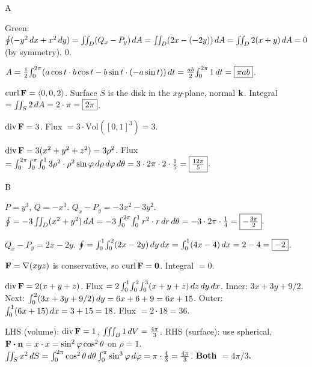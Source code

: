 \documentclass[11pt]{article}
\begin{document}
\begin{answers}{A}
\item Green: $\oint (-y^2 \,dx + x^2 \,dy) = \iint_D (Q_x - P_y) \,dA = \iint_D (2x - (-2y)) \,dA = \iint_D 2(x+y) \,dA = 0$ (by symmetry). $\boxed{0}$.
\item $A = \tfrac{1}{2}\!\int_0^{2\pi}(a\cos t \cdot b\cos t - b\sin t \cdot (-a\sin t)) \,dt = \tfrac{ab}{2}\!\int_0^{2\pi} 1 \,dt = \boxed{\pi a b}$.
\item $\operatorname{curl} \mathbf{F} = \langle 0, 0, 2\rangle$. Surface $S$ is the disk in the $xy$-plane, normal $\mathbf{k}$. Integral $= \iint_S 2 \,dA = 2 \cdot \pi = \boxed{2\pi}$.
\item $\operatorname{div} \mathbf{F} = 3$. Flux $= 3 \cdot \text{Vol}([0,1]^3) = \boxed{3}$.
\item $\operatorname{div} \mathbf{F} = 3(x^2 + y^2 + z^2) = 3\rho^2$. Flux $= \int_0^{2\pi}\!\int_0^\pi\!\int_0^1 3\rho^2 \cdot \rho^2 \sin\varphi \,d\rho \,d\varphi \,d\theta = 3 \cdot 2\pi \cdot 2 \cdot \tfrac{1}{5} = \boxed{\tfrac{12\pi}{5}}$.
\end{answers}

\begin{answers}{B}
\item $P = y^3$, $Q = -x^3$. $Q_x - P_y = -3x^2 - 3y^2$. $\oint = -3\iint_D (x^2 + y^2) \,dA = -3 \int_0^{2\pi}\!\int_0^1 r^2 \cdot r \,dr \,d\theta = -3 \cdot 2\pi \cdot \tfrac{1}{4} = \boxed{-\tfrac{3\pi}{2}}$.
\item $Q_x - P_y = 2x - 2y$. $\oint = \int_0^1\!\int_0^2 (2x - 2y) \,dy \,dx = \int_0^1 (4x - 4) \,dx = 2 - 4 = \boxed{-2}$.
\item $\mathbf{F} = \nabla(xyz)$ is conservative, so $\operatorname{curl} \mathbf{F} = \mathbf{0}$. Integral $= \boxed{0}$.
\item $\operatorname{div} \mathbf{F} = 2(x + y + z)$. Flux $= 2 \int_0^1\!\int_0^2\!\int_0^3 (x+y+z) \,dz \,dy \,dx$. Inner: $3x + 3y + 9/2$. Next: $\int_0^2 (3x + 3y + 9/2) \,dy = 6x + 6 + 9 = 6x + 15$. Outer: $\int_0^1 (6x + 15) \,dx = 3 + 15 = 18$. Flux $= 2 \cdot 18 = \boxed{36}$.
\item LHS (volume): $\operatorname{div} \mathbf{F} = 1$, $\iiint_B 1 \,dV = \tfrac{4\pi}{3}$. RHS (surface): use spherical, $\mathbf{F}\boldsymbol\cdot\mathbf{n} = x \cdot x = \sin^2\varphi\cos^2\theta$ on $\rho = 1$. $\iint_S x^2 \,dS = \int_0^{2\pi}\cos^2\theta \,d\theta\int_0^\pi \sin^3\varphi \,d\varphi = \pi \cdot \tfrac{4}{3} = \tfrac{4\pi}{3}$. \textbf{Both $= 4\pi/3$.} \checkmark
\end{answers}
\end{document}
